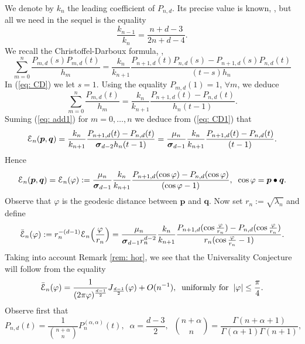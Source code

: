 \documentclass[reqno, 11pt]{amsart}
\theoremstyle{definition}
\numberwithin{equation}{section}
\begin{document}
We denote by $k_n$ the leading coefficient of $P_{n,d}$. Its precise value is known, \cite[Eq. (7.6)]{Mu}, but all we need in the sequel is the equality \cite[Eq. (7.7)]{Mu}
\[
\frac{k_{n-1}}{k_{n}}=\frac{n+d-3}{2n+d-4}.
\]
We recall the Christoffel-Darboux formula, \cite[\S 5.2]{AAR},
\begin{equation}
\sum_{m=0}^{n} \frac{P_{m,d}(s)P_{m,d}(t)}{h_m}= \frac{k_{n}}{k_{n+1}}\frac{ P_{n+1,d}(t)P_{n,d}(s)-P_{n+1,d}(s) P_{n,d}(t)}{(t-s)h_{n}}
\label{eq: CD}
\end{equation}
In (\ref{eq: CD}) we let $s=1$. Using the equality $P_{m,d}(1)=1$, $\forall m$, we deduce
\begin{equation}
\sum_{m=0}^{n} \frac{P_{m,d}(t)}{h_m}=\frac{k_{n}}{k_{n+1}}\frac{P_{n+1,d}(t)-P_{n,d}(t)}{h_{n}(t-1)}.
\label{eq: CD1}
\end{equation}
Suming (\ref{eq: add1})  for $m=0,\dotsc, n$ we deduce from (\ref{eq: CD1}) that
\[
{\EuScript{E}}_n({{\boldsymbol{p}}},{{\boldsymbol{q}}})=\frac{k_{n}}{k_{n+1}}\frac{ P_{n+1,d}(t)-P_{n,d}(t) }{ {\boldsymbol{\sigma}}_{d-2}h_{n}(t-1) }= \frac{ \mu_{n} }{ {\boldsymbol{\sigma}}_{d-1} }\frac{ k_{n} }{k_{n+1}}\frac{P_{n+1,d}(t)-P_{n,d}(t)}{(t-1)}.
\]
Hence
\begin{equation}
{\EuScript{E}}_n({{\boldsymbol{p}}},{{\boldsymbol{q}}})={\EuScript{E}}_n({{\varphi}}):=\frac{ \mu_{n} }{ {\boldsymbol{\sigma}}_{d-1} }\frac{ k_{n} }{k_{n+1}}\frac{P_{n+1,d}(\cos{{\varphi}})-P_{n,d}(\cos{{\varphi}})}{(\cos{{\varphi}}-1)},\;\;\cos{{\varphi}}={{\boldsymbol{p}}}\bullet{{\boldsymbol{q}}}.
\label{eq: spec}
\end{equation}
Observe that   ${{\varphi}}$ is the geodesic distance between ${{\boldsymbol{p}}}$ and ${{\boldsymbol{q}}}$. Now set $r_n:=\sqrt{\lambda_n}$ and define
\[
\bar{\EuScript{E}}_n({{\varphi}}):=r_n^{-(d-1)}{\EuScript{E}}_n\Bigl(\frac{{\varphi}}{r_n}\Bigr) =\frac{ \mu_{n} }{ {\boldsymbol{\sigma}}_{d-1}r_n^{d-2} }\frac{ k_{n} }{k_{n+1}}\frac{P_{n+1,d}(\cos\frac{{\varphi}}{r_n})-P_{n,d}(\cos\frac{{\varphi}}{r_n})}{r_n(\cos\frac{{\varphi}}{r_n}-1)}.
\]
Taking into account Remark \ref{rem: hor}, we see that the Universality Conjecture  will follow  from the equality
\begin{equation}
\bar{\EuScript{E}}_n({{\varphi}})= \frac{1}{(2\pi{{\varphi}})^{\frac{d-1}{2}}} J_{\frac{d-1}{2}}({{\varphi}}) +O(n^{-1}),\;\;\mbox{uniformly for}\;\;|{{\varphi}}|\leq \frac{\pi}{4}.
\label{eq: univ}
\end{equation}
Observe first that   
\begin{equation}
P_{n,d}(t)=\frac{1}{\binom{n+\alpha}{n}}P_n^{(\alpha,\alpha)}(t),\;\;\alpha=\frac{d-3}{2},\;\;\binom{n+\alpha}{n}=\frac{\Gamma(n+\alpha+1)}{\Gamma(\alpha+1)\Gamma(n+1)},
\label{eq: jac}
\end{equation}
\end{document}
